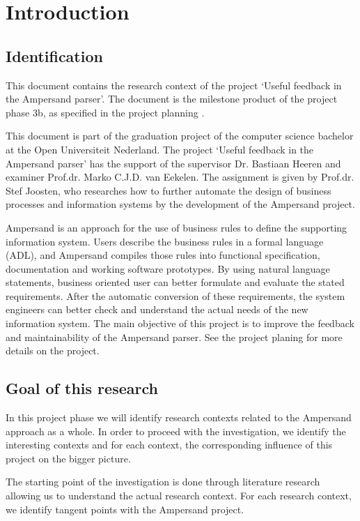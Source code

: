 
\section{Introduction}
\subsection{Identification}
This document contains the research context of the project `Useful feedback in the Ampersand parser'.
The document is the milestone product of the project phase 3b, as specified in the project planning .

This document is part of the graduation project of the computer science bachelor at the Open Universiteit Nederland.
The project `Useful feedback in the Ampersand parser' has the support of the supervisor Dr. Bastiaan Heeren and examiner Prof.dr. Marko C.J.D. van Eekelen.
The assignment is given by Prof.dr. Stef Joosten, who researches how to further automate the design of business processes and information systems by the development of the Ampersand project.

Ampersand is an approach for the use of business rules to define the supporting information system.
Users describe the business rules in a formal language (ADL), and Ampersand compiles those rules into functional specification, documentation and working software prototypes. 
By using natural language statements, business oriented user can better formulate and evaluate the stated requirements.
After the automatic conversion of these requirements, the system engineers can better check and understand the actual needs of the new information system.
The main objective of this project is to improve the feedback and maintainability of the Ampersand parser.
See the project planing  for more details on the project.

\subsection{Goal of this research}
In this project phase we will identify research contexts related to the Ampersand approach as a whole.
In order to proceed with the investigation, we identify the interesting contexts and for each context, the corresponding influence of this project on the bigger picture.

The starting point of the investigation is done through literature research allowing us to understand the actual research context.
For each research context, we identify tangent points with the Ampersand project.

